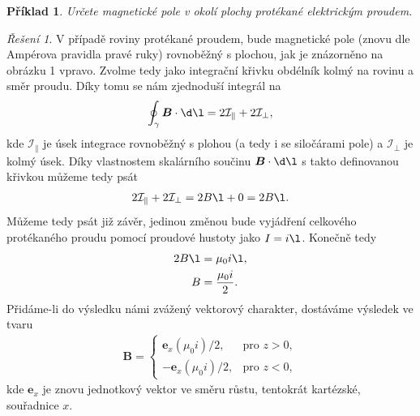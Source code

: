 \documentclass[11pt,a4paper]{report}
\renewcommand{\vec}{\boldsymbol}
\theoremstyle{theorem}
\newtheorem{example}{Příklad}
\theoremstyle{remark}
\newtheorem*{solution}{Řešení}
\theoremstyle{definition}
\begin{document}
		\begin{example}
			\label{3}
			Určete magnetické pole v okolí plochy protékané elektrickým proudem.
		\end{example}
		\begin{solution}
			V případě roviny protékané proudem, bude magnetické pole (znovu dle Ampérova pravidla pravé ruky) rovnoběžný s plochou, jak je znázorněno na obrázku 1 vpravo. Zvolme tedy jako integrační křivku obdélník kolmý na rovinu a směr proudu. Díky tomu se nám zjednoduší integrál na
			\begin{align*}
				\oint_\gamma \vec B \cdot \d \vec \l = 2 \mathcal I_\parallel + 2 \mathcal I_\perp,
			\end{align*}
			kde $\mathcal I_\parallel$ je úsek integrace rovnoběžný s plohou (a tedy i se siločárami pole) a $\mathcal I_\perp$ je kolmý úsek. Díky vlastnostem skalárního součinu $\vec B \cdot \d \l$ s takto definovanou křivkou můžeme tedy psát
			\begin{align*}
				2 \mathcal I_\parallel + 2 \mathcal I_\perp = 2B\l + 0 = 2B\l.
			\end{align*}
			Můžeme tedy psát již závěr, jedinou změnou bude vyjádření celkového protékaného proudu pomocí proudové hustoty jako $I = i \l$. Konečně tedy
			\begin{align*}
				2B\l &= \mu_0 i \l,
			\\
				B &= \frac{\mu_0 i}{2}.
			\end{align*}
			Přidáme-li do výsledku námi zvážený vektorový charakter, dostáváme výsledek ve tvaru
			\begin{align*}
				\vec B = \left\{ \begin{matrix}
					\vec e_x (\mu_0 i)/2, & \text{pro } z > 0,
				\\
					- \vec e_x (\mu_0 i)/2, & \text{pro } z < 0,
				\end{matrix} \right.
			\end{align*}
			kde $\vec e_x$ je znovu jednotkový vektor ve směru růstu, tentokrát kartézské, souřadnice $x$.
		\end{solution}
		
\end{document}
